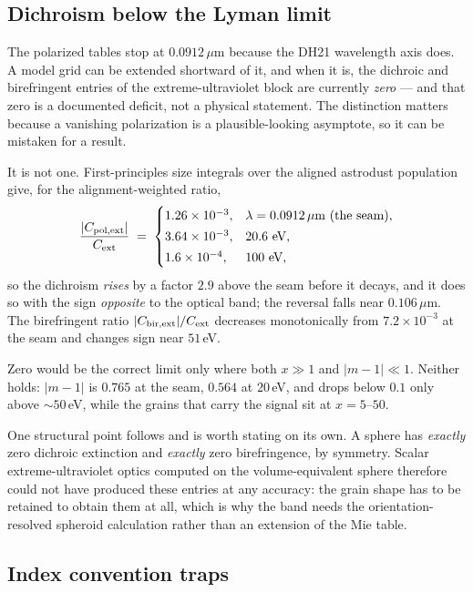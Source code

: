 \documentclass{my_memo}
\newcommand{\um}{\ensuremath{\,\mu\mathrm{m}}}
\newcommand{\Cext}{\ensuremath{C_{\rm ext}}}
\begin{document}
\subsection{Dichroism below the Lyman limit}
\label{sec:euvdichroism}

The polarized tables stop at $0.0912\um$ because the DH21 wavelength axis
does. A model grid can be extended shortward of it, and when it is, the
dichroic and birefringent entries of the extreme-ultraviolet block are
currently \emph{zero} --- and that zero is a documented deficit, not a
physical statement. The distinction matters because a vanishing
polarization is a plausible-looking asymptote, so it can be mistaken for
a result.

It is not one. First-principles size integrals over the aligned astrodust
population give, for the alignment-weighted ratio,
\begin{equation}
  \frac{|C_{\rm pol,ext}|}{\Cext}
  \;=\;
  \begin{cases}
    1.26\times10^{-3}, & \lambda = 0.0912\um\ \hbox{(the seam)},\\[2pt]
    3.64\times10^{-3}, & 20.6\ \hbox{eV},\\[2pt]
    1.6\times10^{-4},  & 100\ \hbox{eV},
  \end{cases}
  \label{eq:euvpol}
\end{equation}
so the dichroism \emph{rises} by a factor $2.9$ above the seam before it
decays, and it does so with the sign \emph{opposite} to the optical band;
the reversal falls near $0.106\um$. The birefringent ratio
$|C_{\rm bir,ext}|/\Cext$ decreases monotonically from $7.2\times10^{-3}$
at the seam and changes sign near $51$\,eV.

Zero would be the correct limit only where both $x \gg 1$ and
$|m-1| \ll 1$. Neither holds: $|m-1|$ is $0.765$ at the seam, $0.564$ at
$20$\,eV, and drops below $0.1$ only above ${\sim}50$\,eV, while the
grains that carry the signal sit at $x = 5$--$50$.

One structural point follows and is worth stating on its own. A sphere
has \emph{exactly} zero dichroic extinction and \emph{exactly} zero
birefringence, by symmetry. Scalar extreme-ultraviolet optics computed on
the volume-equivalent sphere therefore could not have produced these
entries at any accuracy: the grain shape has to be retained to obtain
them at all, which is why the band needs the orientation-resolved
spheroid calculation rather than an extension of the Mie table.

\subsection{Index convention traps}
\end{document}
